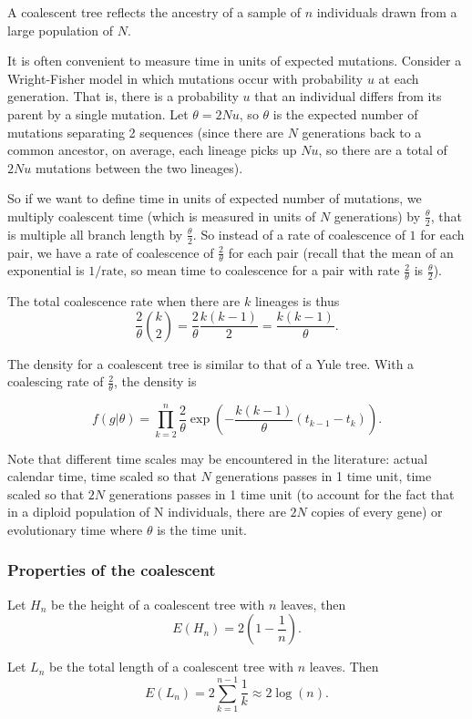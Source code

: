 \documentclass[11pt]{article}
\begin{document}
A coalescent tree reflects the ancestry of a sample of $n$ individuals drawn from a large population of $N$.  


It is often convenient to measure time in units of expected mutations.  Consider a Wright-Fisher model in which mutations occur with probability $u$ at each generation.  That is, there is a probability $u$ that  an individual differs from its parent by a single mutation.  Let $\theta = 2Nu$, so $\theta$ is the expected number of mutations separating 2 sequences (since there are $N$ generations back to a common ancestor, on average, each lineage picks up $Nu$, so there are a total of $2Nu$ mutations between the two lineages).  

So if we want to define time in units of expected number of mutations, we multiply coalescent time (which is measured in units of $N$ generations) by $\frac {\theta}2$, that is multiple all branch length by $\frac{\theta}{2}$.   So instead of a rate of coalescence of $1$ for each pair, we have a rate of coalescence of $\frac 2{\theta}$ for each pair (recall that the mean of an exponential is $1/\mbox{rate}$, so mean time to coalescence for a pair with rate $\frac{2}{\theta}$ is $\frac{\theta}{2}$).

The total coalescence rate when there are $k$ lineages is thus \[ \frac{2}{\theta} {k \choose 2} = \frac{2}{\theta} \frac{k(k-1)}{2} = \frac{k(k-1)}{\theta}.\]


The density for a coalescent tree is similar to that of a Yule tree.  With a coalescing rate of $\frac{2}{\theta}$, the density is 


\[ f(g|\theta)  = \prod_{k=2}^n  \frac{2}{\theta} \exp(-\frac{ k(k-1)}{\theta} (t_{k-1} -t_k)).  \]

 
 Note that different time scales may be encountered in the literature: actual calendar time, time scaled so that $N$ generations passes in 1 time unit, time scaled so that $2N$ generations passes in 1 time unit (to account for the fact that in a diploid population of N individuals, there are $2N$ copies of every gene)  or evolutionary time where $\theta$ is the time unit.  
 
 
\subsubsection{Properties of the coalescent}

Let $H_n$ be the height of a coalescent tree with $n$ leaves, then \[ E(H_n) = 2\left(1 - \frac1n\right).\]

Let $L_n$ be the total length of a coalescent tree with $n$ leaves.  Then \[E(L_n) = 2 \sum_{k= 1}^{n-1} \frac 1 k \approx 2 \log(n).\]

 
 
\end{document}
